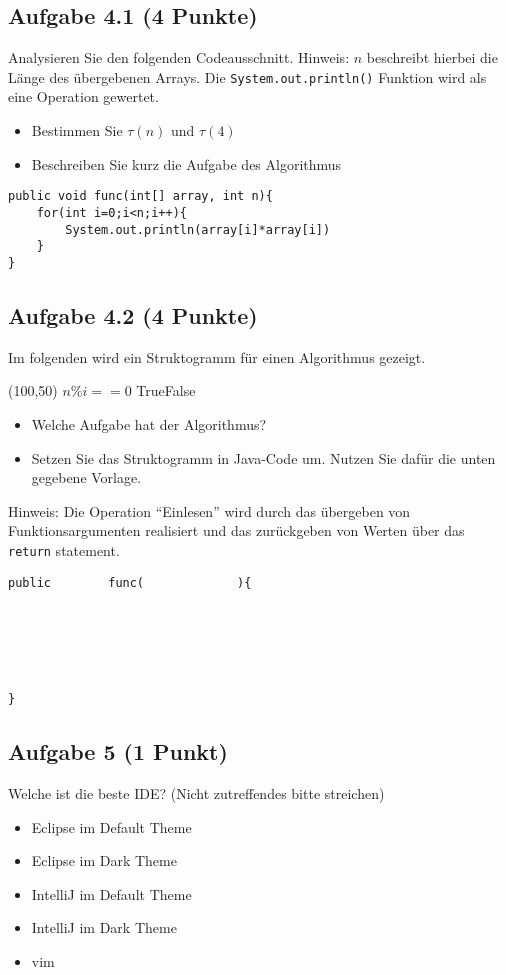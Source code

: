 \documentclass[a4paper,
			   fontsize=12pt]{article}
\begin{document}
\newpage
\subsection*{Aufgabe 4.1 (4 Punkte)}
Analysieren Sie den folgenden Codeausschnitt. Hinweis: $n$ beschreibt hierbei die Länge des übergebenen Arrays. Die \texttt{System.out.println()} Funktion wird als eine Operation gewertet.
\begin{itemize}
	\item Bestimmen Sie $\tau(n)$ und $\tau(4)$
	\item Beschreiben Sie kurz die Aufgabe des Algorithmus
\end{itemize}

\begin{lstlisting}
public void func(int[] array, int n){
	for(int i=0;i<n;i++){
		System.out.println(array[i]*array[i])
	}
}
\end{lstlisting}

\vspace{5cm}
\subsection*{Aufgabe 4.2 (4 Punkte)}
Im folgenden wird ein Struktogramm für einen Algorithmus gezeigt.

\begin{centernss}
	\begin{struktogramm}(100,50)
			{ \( n\%i==0 \) }{True}{False}
			\change
			\endif
		\whileend
	\end{struktogramm}
\end{centernss}

\begin{itemize}
	\item Welche Aufgabe hat der Algorithmus?
	\item Setzen Sie das Struktogramm in Java-Code um. Nutzen Sie dafür die unten gegebene Vorlage.
\end{itemize}

\vspace{2cm}

Hinweis: Die Operation "`Einlesen"' wird durch das übergeben von Funktionsargumenten realisiert und das zurückgeben von Werten über das \texttt{return} statement.

\begin{lstlisting}
public        func(             ){






}
\end{lstlisting}

\subsection*{Aufgabe 5 (1 Punkt)}
Welche ist die beste IDE? (Nicht zutreffendes bitte streichen)
\begin{itemize}
	\item Eclipse im Default Theme
	\item Eclipse im Dark Theme
	\item IntelliJ im Default Theme
	\item IntelliJ im Dark Theme
	\item vim
\end{itemize}
\end{document}

